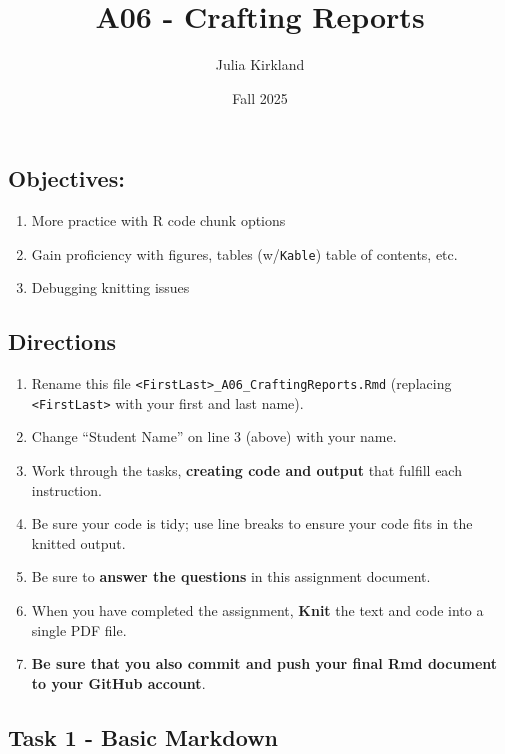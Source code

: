 \documentclass[
]{article}
\title{A06 - Crafting Reports}
\author{Julia Kirkland}
\date{Fall 2025}
\providecommand{\tightlist}{%
  \setlength{\itemsep}{0pt}\setlength{\parskip}{0pt}}
\begin{document}
\maketitle

\subsection{Objectives:}\label{objectives}

\begin{enumerate}
\def\labelenumi{\arabic{enumi}.}
\tightlist
\item
  More practice with R code chunk options
\item
  Gain proficiency with figures, tables (w/\texttt{Kable}) table of
  contents, etc.
\item
  Debugging knitting issues
\end{enumerate}

\subsection{Directions}\label{directions}

\begin{enumerate}
\def\labelenumi{\arabic{enumi}.}
\tightlist
\item
  Rename this file
  \texttt{\textless{}FirstLast\textgreater{}\_A06\_CraftingReports.Rmd}
  (replacing \texttt{\textless{}FirstLast\textgreater{}} with your first
  and last name).
\item
  Change ``Student Name'' on line 3 (above) with your name.
\item
  Work through the tasks, \textbf{creating code and output} that fulfill
  each instruction.
\item
  Be sure your code is tidy; use line breaks to ensure your code fits in
  the knitted output.
\item
  Be sure to \textbf{answer the questions} in this assignment document.
\item
  When you have completed the assignment, \textbf{Knit} the text and
  code into a single PDF file.
\item
  \textbf{Be sure that you also commit and push your final Rmd document
  to your GitHub account}.
\end{enumerate}

\subsection{Task 1 - Basic Markdown}\label{task-1---basic-markdown}
\end{document}
